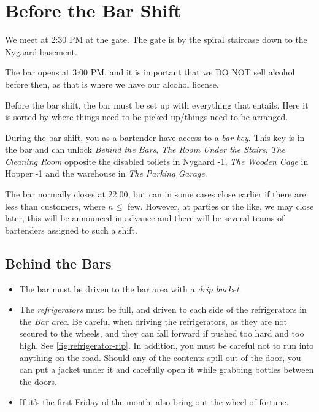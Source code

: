 \section{Before the Bar Shift}
\label{sec:pre-bar-shift}

We meet at 2:30 PM at the gate. The gate is by the spiral staircase down to the Nygaard basement.

The bar opens at 3:00 PM, and it is important
that we DO NOT sell alcohol before then, as that is where we have our alcohol license.

Before the bar shift, the bar must be set up with everything that entails. Here
it is sorted by where things need to be picked up/things need to be arranged.

During the bar shift, you as a bartender have access to a \textit{bar key}.
This key is in the bar and can unlock \textit{Behind the Bars},
\textit{The Room Under the Stairs},
\textit{The Cleaning Room} opposite the disabled toilets in Nygaard -1,
\textit{The Wooden Cage} in Hopper -1
and the warehouse in \textit{The Parking Garage}.

The bar normally closes at 22:00, but can in some cases close earlier if there are less
than customers, where $n \le$ few.
However, at parties or the like, we may close later, this will be announced in advance and there will
be several teams of bartenders assigned to such a shift.

\subsection{Behind the Bars}
\label{sec:pre:behind-the-bars}

\begin{itemize}
	\item The bar must be driven to the bar area with a \textit{drip bucket}.
	\item The \textit{refrigerators} must be full, and driven to each side of the refrigerators in the
	\textit{Bar area}. Be careful when driving the refrigerators, as they are not secured to the wheels,
	and they can fall forward if pushed too hard and too high. See \autoref{fig:refrigerator-rip}. In addition,
	you must be careful not to run into anything on the road. Should any of the contents spill out of the door, you can put a jacket
	under it and carefully open it while grabbing bottles between the doors.
	\item If it's the first Friday of the month, also bring out the wheel of fortune.
\end{itemize}

